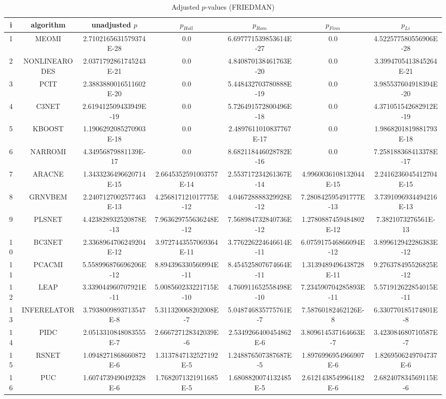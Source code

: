 \documentclass[a4paper,10pt]{article}
\begin{document}
\begin{landscape}
\begin{table}[!htp]
\centering\scriptsize
\caption{Adjusted $p$-values (FRIEDMAN)}
\begin{tabular}{ccccccc}
i&algorithm&unadjusted $p$&$p_{Holl}$&$p_{Rom}$&$p_{Finn}$&$p_{Li}$\\
\hline
1&MEOMI&2.7102165631579374E-28&0.0&6.697771539853614E-27&0.0&4.522577580556906E-28\\
2&NONLINEARODES&2.0371792861745243E-21&0.0&4.840870138461763E-20&0.0&3.3994705413845264E-21\\
3&PCIT&2.3883880016511602E-20&0.0&5.448432703780888E-19&0.0&3.985537604918394E-20\\
4&C3NET&2.619412509433949E-19&0.0&5.726491572800496E-18&0.0&4.371051542682912E-19\\
5&KBOOST&1.1906292085270903E-18&0.0&2.4897611010837767E-17&0.0&1.9868201819881793E-18\\
6&NARROMI&4.34956879881139E-17&0.0&8.682118446028782E-16&0.0&7.258188368413378E-17\\
7&ARACNE&1.3433236496620714E-15&2.6645352591003757E-14&2.553717234261367E-14&4.9960036108132044E-15&2.2416236045412704E-15\\
8&GRNVBEM&2.2407127002577463E-13&4.256817121017775E-12&4.046728888329928E-12&7.280842595491777E-13&3.7391096934494216E-13\\
9&PLSNET&4.423828932520878E-13&7.963629755636248E-12&7.568984732840736E-12&1.2780887459484802E-12&7.3821073276561E-13\\
10&BC3NET&2.3368964706249204E-12&3.9727443557069364E-11&3.776226224646614E-11&6.075917546866094E-12&3.899612942286383E-12\\
11&PCACMI&5.558996876696206E-12&8.894396330560994E-11&8.454525807674664E-11&1.3139489496438728E-11&9.276378495526825E-12\\
12&LEAP&3.339044960707921E-11&5.008560233221715E-10&4.760911652558498E-10&7.234590704285893E-11&5.571912622854015E-11\\
13&INFERELATOR&3.7938009893713547E-8&5.311320068202008E-7&5.048746835775761E-7&7.58760182462126E-8&6.330770185174801E-8\\
14&PIDC&2.0513310848083555E-7&2.666727128342039E-6&2.5349266400454862E-6&3.809614537164663E-7&3.423084680710587E-7\\
15&RSNET&1.0948271868660872E-6&1.3137847132527192E-5&1.248876507387687E-5&1.8976996954966907E-6&1.8269506249704737E-6\\
16&PUC&1.6074739490492328E-6&1.7682071321911685E-5&1.6808820074132485E-5&2.6121438549964182E-6&2.682407834569115E-6\\

\end{tabular}
\end{table}
\end{landscape}
\end{document}
